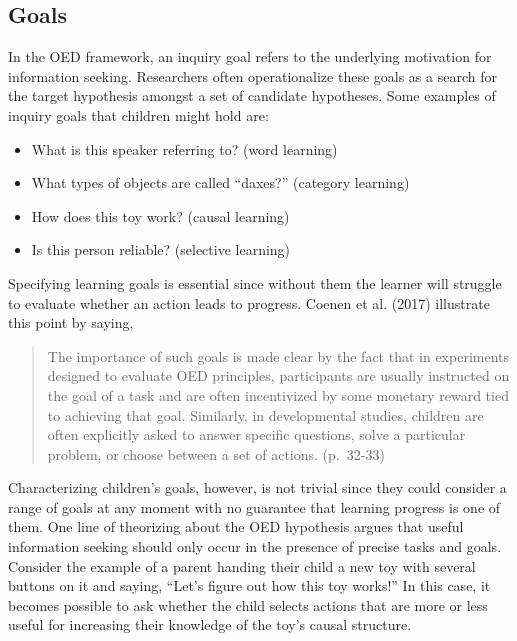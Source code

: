 \documentclass[oneside]{report}
\begin{document}
\subsection{Goals}\label{goals}

In the OED framework, an inquiry goal refers to the underlying
motivation for information seeking. Researchers often operationalize
these goals as a search for the target hypothesis amongst a set of
candidate hypotheses. Some examples of inquiry goals that children might
hold are:
\begin{itemize}
\tightlist
\item
  What is this speaker referring to? (word learning)
\item
  What types of objects are called ``daxes?'' (category learning)
\item
  How does this toy work? (causal learning)
\item
  Is this person reliable? (selective learning)
\end{itemize}
\noindent
Specifying learning goals is essential since without them the learner
will struggle to evaluate whether an action leads to progress. Coenen et
al. (2017) illustrate this point by saying,
\begin{quote}
The importance of such goals is made clear by the fact that in
experiments designed to evaluate OED principles, participants are
usually instructed on the goal of a task and are often incentivized by
some monetary reward tied to achieving that goal. Similarly, in
developmental studies, children are often explicitly asked to answer
specific questions, solve a particular problem, or choose between a set
of actions. (p.~32-33)
\end{quote}
\noindent
Characterizing children's goals, however, is not trivial since they
could consider a range of goals at any moment with no guarantee that
learning progress is one of them. One line of theorizing about the OED
hypothesis argues that useful information seeking should only occur in
the presence of precise tasks and goals. Consider the example of a
parent handing their child a new toy with several buttons on it and
saying, ``Let's figure out how this toy works!'' In this case, it
becomes possible to ask whether the child selects actions that are more
or less useful for increasing their knowledge of the toy's causal
structure.
\end{document}
